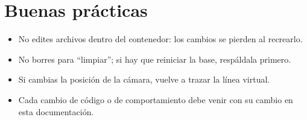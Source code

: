 \section{Buenas prácticas}

\begin{itemize}
  \item No edites archivos dentro del contenedor: los cambios se pierden al
        recrearlo.
  \item No borres  para ``limpiar''; si hay que reiniciar la base,
        respáldala primero.
  \item Si cambias la posición de la cámara, vuelve a trazar la línea virtual.
  \item Cada cambio de código o de comportamiento debe venir con su cambio en
        esta documentación.
\end{itemize}
